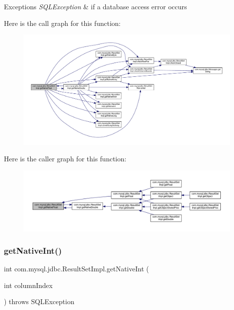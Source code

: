\begin{DoxyExceptions}{Exceptions}
{\em S\+Q\+L\+Exception} & if a database access error occurs \\
\hline
\end{DoxyExceptions}
Here is the call graph for this function\+:
\nopagebreak
\begin{figure}[H]
\begin{center}
\leavevmode
\includegraphics[width=350pt]{classcom_1_1mysql_1_1jdbc_1_1_result_set_impl_ab7767239a1beed604ab40849316407c0_cgraph}
\end{center}
\end{figure}
Here is the caller graph for this function\+:
\nopagebreak
\begin{figure}[H]
\begin{center}
\leavevmode
\includegraphics[width=350pt]{classcom_1_1mysql_1_1jdbc_1_1_result_set_impl_ab7767239a1beed604ab40849316407c0_icgraph}
\end{center}
\end{figure}
\mbox{\label{classcom_1_1mysql_1_1jdbc_1_1_result_set_impl_a43ab3c7c0eef581dfd7643d15d8f3eb4}} 
\subsubsection{\texorpdfstring{get\+Native\+Int()}{getNativeInt()}}
{\footnotesize\ttfamily int com.\+mysql.\+jdbc.\+Result\+Set\+Impl.\+get\+Native\+Int (\begin{DoxyParamCaption}\item[{int}]{column\+Index }\end{DoxyParamCaption}) throws S\+Q\+L\+Exception\hspace{0.3cm}{\ttfamily [protected]}}

